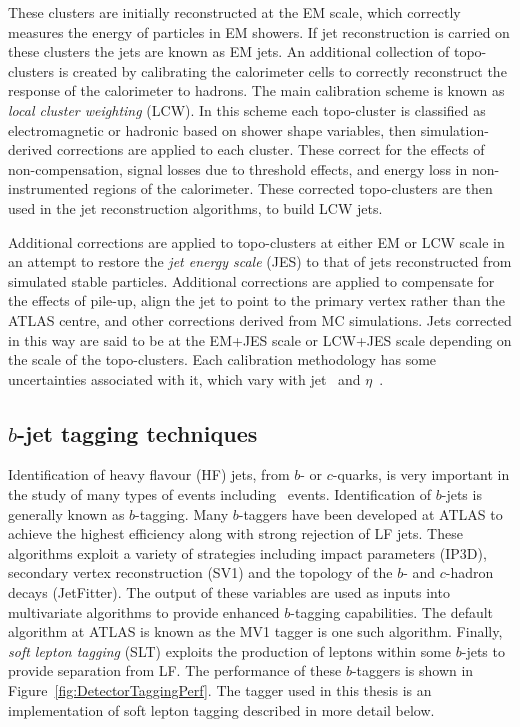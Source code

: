These clusters are initially reconstructed at the EM scale, which correctly measures the energy of particles in EM showers. If jet reconstruction is carried on these clusters the jets are known as EM jets. An additional collection of topo-clusters is created by calibrating the calorimeter cells to correctly reconstruct the response of the calorimeter to hadrons. The main calibration scheme is known as \emph{local cluster weighting} (LCW). In this scheme each topo-cluster is classified as electromagnetic or hadronic based on shower shape variables, then simulation-derived corrections are applied to each cluster. These correct for the effects of non-compensation, signal losses due to threshold effects, and energy loss in non-instrumented regions of the calorimeter. These corrected topo-clusters are then used in the jet reconstruction algorithms, to build LCW jets. 

Additional corrections are applied to topo-clusters at either EM or LCW scale in an attempt to restore the \emph{jet energy scale} (JES) to that of jets reconstructed from simulated stable particles. Additional corrections are applied to compensate for the effects of pile-up, align the jet to point to the primary vertex rather than the ATLAS centre, and other corrections derived from MC simulations. Jets corrected in this way are said to be at the EM+JES scale or LCW+JES scale depending on the scale of the topo-clusters. Each calibration methodology has some uncertainties associated with it, which vary with jet \pt\ and $\eta$~\cite{Detector:JESPaper}.

\subsection{\texorpdfstring{$b$}{b}-jet tagging techniques}

Identification of heavy flavour (HF) jets, from $b$- or $c$-quarks, is very important in the study of many types of events including \ttbar\ events. Identification of $b$-jets is generally known as $b$-tagging. Many $b$-taggers have been developed at ATLAS to achieve the highest efficiency along with strong rejection of LF jets. These algorithms exploit a variety of strategies including impact parameters (IP3D), secondary vertex reconstruction (SV1) and the topology of the $b$- and $c$-hadron decays (JetFitter). The output of these variables are used as inputs into multivariate algorithms to provide enhanced $b$-tagging capabilities. The default algorithm at ATLAS is known as the MV1 tagger is one such algorithm. Finally, \emph{soft lepton tagging} (SLT) exploits the production of leptons within some $b$-jets to provide separation from LF. The performance of these $b$-taggers is shown in Figure~\ref{fig:DetectorTaggingPerf}. The tagger used in this thesis is an implementation of soft lepton tagging described in more detail below.


